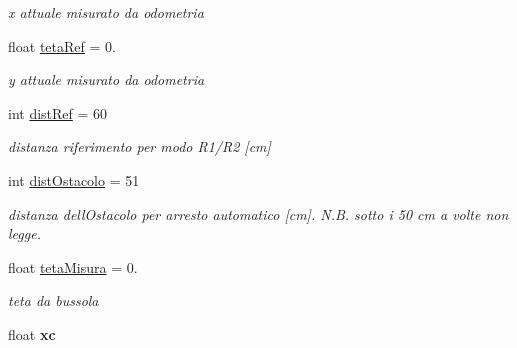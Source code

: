 \begin{DoxyCompactItemize}
\begin{DoxyCompactList}\small\item\em x attuale misurato da odometria \end{DoxyCompactList}\item 
\mbox{\label{ari_pi__2_d_c__esp__08_8ino_a75a4104f4a9f0fc17b53a88379ed7130}} 
float \mbox{\hyperlink{ari_pi__2_d_c__esp__08_8ino_a75a4104f4a9f0fc17b53a88379ed7130}{teta\+Ref}} = 0.
\begin{DoxyCompactList}\small\item\em y attuale misurato da odometria \end{DoxyCompactList}\item 
\mbox{\label{ari_pi__2_d_c__esp__08_8ino_a31ffabe41a3c406008dc3c8660baa084}} 
int \mbox{\hyperlink{ari_pi__2_d_c__esp__08_8ino_a31ffabe41a3c406008dc3c8660baa084}{dist\+Ref}} = 60
\begin{DoxyCompactList}\small\item\em distanza riferimento per modo R1/\+R2 \mbox{[}cm\mbox{]} \end{DoxyCompactList}\item 
\mbox{\label{ari_pi__2_d_c__esp__08_8ino_abe38243dd59764cbd8a4029c2683a702}} 
int \mbox{\hyperlink{ari_pi__2_d_c__esp__08_8ino_abe38243dd59764cbd8a4029c2683a702}{dist\+Ostacolo}} = 51
\begin{DoxyCompactList}\small\item\em distanza dell\textquotesingle{}Ostacolo per arresto automatico \mbox{[}cm\mbox{]}. N.\+B. sotto i 50 cm a volte non legge. \end{DoxyCompactList}\item 
\mbox{\label{ari_pi__2_d_c__esp__08_8ino_ae26b39d3cd60fb721672915cdb90d756}} 
float \mbox{\hyperlink{ari_pi__2_d_c__esp__08_8ino_ae26b39d3cd60fb721672915cdb90d756}{teta\+Misura}} = 0.
\begin{DoxyCompactList}\small\item\em teta da bussola \end{DoxyCompactList}\item 
\mbox{\label{ari_pi__2_d_c__esp__08_8ino_a8c4da7cbc4b1a3cc91ebb8aeb7ecabbd}} 
float {\bfseries xc}
\item 

\end{DoxyCompactItemize}
